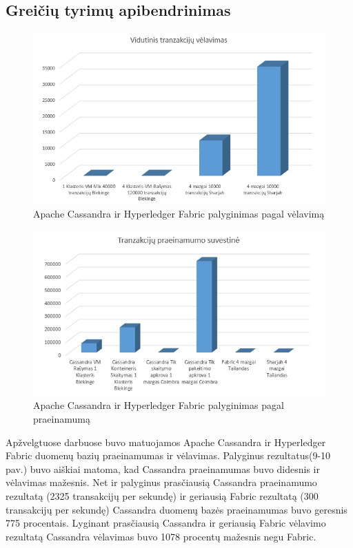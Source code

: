 \documentclass{VUMIFPSkursinis}
\begin{document}
\subsection{Greičių tyrimų apibendrinimas}
\begin{figure}[H]
\centering
\includegraphics[scale=0.6]{img/CasHypLat}
\caption{Apache Cassandra ir Hyperledger Fabric palyginimas pagal vėlavimą} %
\label{img:mlp}
\end{figure}
\begin{figure}[H]
\centering
\includegraphics[scale=0.6]{img/CasHypTp}
\caption{Apache Cassandra ir Hyperledger Fabric palyginimas pagal praeinamumą} %
\label{img:mlp}
\end{figure}

Apžvelgtuose darbuose buvo matuojamos Apache Cassandra ir Hyperledger Fabric duomenų bazių praeinamumas ir vėlavimas.
Palyginus rezultatus(9-10 pav.) buvo aiškiai matoma, kad Cassandra praeinamumas buvo didesnis ir vėlavimas mažesnis. 
Net ir palyginus prasčiausią Cassandra praeinamumo rezultatą (2325 transakcijų per sekundę) ir geriausią Fabric rezultatą (300 transakcijų per sekundę) Cassandra duomenų bazės praeinamumas buvo geresnis 775 procentais. Lyginant prasčiausią Cassandra ir geriausią Fabric vėlavimo rezultatą Cassandra vėlavimas buvo 1078 procentų mažesnis negu Fabric.
\pagebreak
\end{document}
